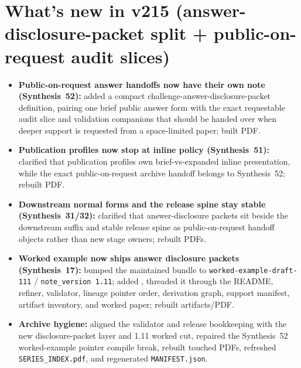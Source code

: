 \documentclass[11pt]{article}
\begin{document}
\section{What's new in v215 (answer-disclosure-packet split + public-on-request audit slices)}
\begin{itemize}[leftmargin=*]
\item \textbf{Public-on-request answer handoffs now have their own note (Synthesis~52):} added a compact challenge-answer-disclosure-packet definition, pairing one brief public answer form with the exact requestable audit slice and validation companions that should be handed over when deeper support is requested from a space-limited paper; built PDF.
\item \textbf{Publication profiles now stop at inline policy (Synthesis~51):} clarified that publication profiles own brief-vs-expanded inline presentation, while the exact public-on-request archive handoff belongs to Synthesis~52; rebuilt PDF.
\item \textbf{Downstream normal forms and the release spine stay stable (Synthesis~31/32):} clarified that answer-disclosure packets sit beside the downstream suffix and stable release spine as public-on-request handoff objects rather than new stage owners; rebuilt PDFs.
\item \textbf{Worked example now ships answer disclosure packets (Synthesis~17):} bumped the maintained bundle to \texttt{worked-example-draft-111} / \texttt{note\_version 1.11}; added , threaded it through the README, refiner, validator, lineage pointer order, derivation graph, support manifest, artifact inventory, and worked paper; rebuilt artifacts/PDF.
\item \textbf{Archive hygiene:} aligned the validator and release bookkeeping with the new disclosure-packet layer and 1.11 worked cut, repaired the Synthesis~52 worked-example pointer compile break, rebuilt touched PDFs, refreshed \texttt{SERIES\_INDEX.pdf}, and regenerated \texttt{MANIFEST.json}.
\end{itemize}
\end{document}
